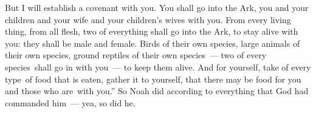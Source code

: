 \begin{inparaenum}
   But I will establish a covenant with you. You shall go into the Ark, you and your children and your wife and your children's wives with you.%
   From every living thing, from all flesh, two of everything shall go into the Ark, to stay alive with you: they shall be male and female.%
   Birds of their own species, large animals of their own species, ground reptiles of their own species~--- two of every species\understood\ shall go in with you~--- to keep them alive.%
   And for yourself, take of every type\understood\ of food that is eaten, gather it to yourself, that there may be food for you and those who are\understood\ with you.''%
   So Noah did according to everything that God had commanded him~--- yea, so did he.%
\end{inparaenum}
